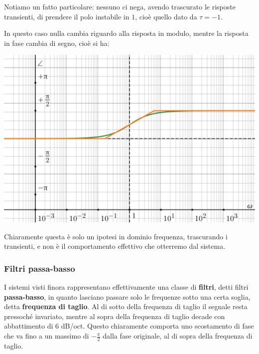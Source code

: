 \documentclass[a4paper,11pt]{article}
\begin{document}
\par\medskip

Notiamo un fatto particolare: nessuno ci nega, avendo trascurato le risposte transienti, di prendere il polo instabile in $1$, cioè quello dato da $\tau = -1$.

\par\medskip

\noindent
\begin{minipage}{\textwidth}
In questo caso nulla cambia riguardo alla risposta in modulo, mentre la risposta in fase cambia di segno, cioè si ha:
\begin{center}
	\includegraphics[scale=0.3]{../figures/lowpass_bode/phase_weird.png}
\end{center}
\end{minipage}

\par\medskip

Chiaramente questa è solo un ipotesi in dominio frequenza, trascurando i transienti, e non è il comportamento effettivo che otterremo dal sistema.

\subsubsection{Filtri passa-basso}
I sistemi visti finora rappresentano effettivamente una classe di \textbf{filtri}, detti filtri \textbf{passa-basso}, in quanto lasciano passare solo le frequenze sotto una certa soglia, detta \textbf{frequenza di taglio}.
Al di sotto della frequenza di taglio il segnale resta pressoché invariato, mentre al sopra della frequenza di taglio decade con abbattimento di 6 dB/oct.
Questo chiaramente comporta uno scostamento di fase che va fino a un massimo di $-\frac{\pi}{2}$ dalla fase originale, al di sopra della frequenza di taglio.
\end{document}
